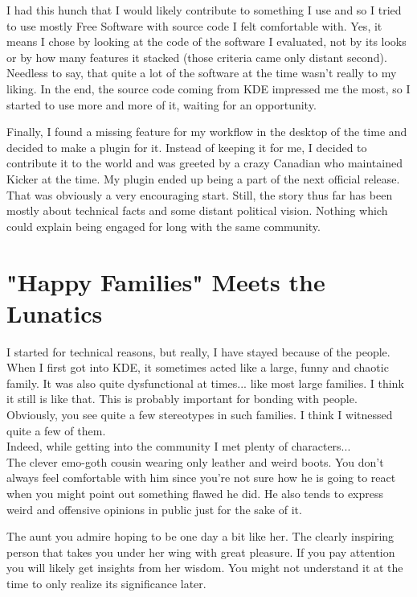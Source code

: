 I had this hunch that I would likely contribute to something I use and so I
tried to use mostly Free Software with source code I felt comfortable with.
Yes, it means I chose by looking at the code of the software I evaluated, not
by its looks or by how many features it stacked (those criteria came only
distant second). Needless to say, that quite a lot of the software at the time
wasn't really to my liking. In the end, the source code coming from KDE
impressed me the most, so I started to use more and more of it, waiting for an
opportunity.

Finally, I found a missing feature for my workflow in the desktop of the time
and decided to make a plugin for it. Instead of keeping it for me, I decided to
contribute it to the world and was greeted by a crazy Canadian who maintained
Kicker at the time. My plugin ended up being a part of the next official release. \\

That was obviously a very encouraging start. Still, the story thus far has been  mostly about
technical facts and some distant political vision. Nothing which could explain
being engaged for long with the same community.

\section*{"Happy Families" Meets the Lunatics}
I started for technical reasons, but really, I have stayed because of the people.
When I first got into KDE, it sometimes acted like a large, funny and chaotic family.
It was also quite dysfunctional at times... like most large families. I think it
still is like that. This is probably important for bonding with people. Obviously,
you see quite a few stereotypes in such families. I think I witnessed quite a
few of them. \\

Indeed, while getting into the community I met plenty of characters... \\

The clever emo-goth cousin wearing only leather and weird boots. You don't
always feel comfortable with him since you're not sure how he is going to react
when you might point out something flawed he did. He also tends to express
weird and offensive opinions in public just for the sake of it.

The aunt you admire hoping to be one day a bit like her. The clearly inspiring
person that takes you under her wing with great pleasure. If you pay attention
you will likely get insights from her wisdom. You might not understand it at
the time to only realize its significance later.


